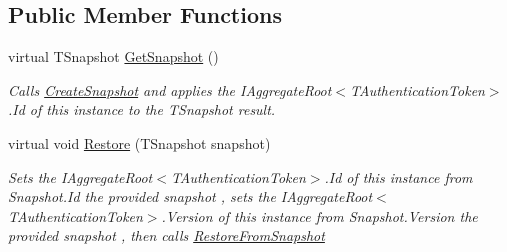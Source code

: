 \subsection*{Public Member Functions}
\begin{DoxyCompactItemize}
\item 
virtual T\+Snapshot \hyperlink{classCqrs_1_1Akka_1_1Snapshots_1_1AkkaSnapshotAggregateRoot_aa2cae5c16494be3a481c7a7dd5618909_aa2cae5c16494be3a481c7a7dd5618909}{Get\+Snapshot} ()
\begin{DoxyCompactList}\small\item\em Calls \hyperlink{classCqrs_1_1Akka_1_1Snapshots_1_1AkkaSnapshotAggregateRoot_af8493f71231046d91210406c3b831e20_af8493f71231046d91210406c3b831e20}{Create\+Snapshot} and applies the I\+Aggregate\+Root$<$\+T\+Authentication\+Token$>$.\+Id of this instance to the {\itshape T\+Snapshot}  result. \end{DoxyCompactList}\item 
virtual void \hyperlink{classCqrs_1_1Akka_1_1Snapshots_1_1AkkaSnapshotAggregateRoot_a3dc19cbc4e4adbba79d3e7452dca5d5e_a3dc19cbc4e4adbba79d3e7452dca5d5e}{Restore} (T\+Snapshot snapshot)
\begin{DoxyCompactList}\small\item\em Sets the I\+Aggregate\+Root$<$\+T\+Authentication\+Token$>$.\+Id of this instance from Snapshot.\+Id the provided {\itshape snapshot} , sets the I\+Aggregate\+Root$<$\+T\+Authentication\+Token$>$.\+Version of this instance from Snapshot.\+Version the provided {\itshape snapshot} , then calls \hyperlink{classCqrs_1_1Akka_1_1Snapshots_1_1AkkaSnapshotAggregateRoot_ad0a742b95699a997e51f03140c50fb74_ad0a742b95699a997e51f03140c50fb74}{Restore\+From\+Snapshot} \end{DoxyCompactList}\end{DoxyCompactItemize}
